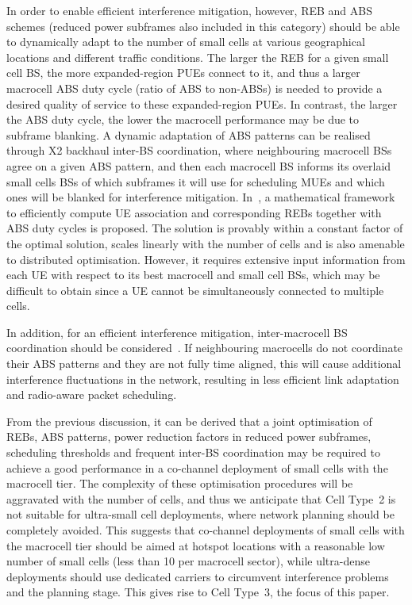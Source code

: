 \documentclass{IEEEtran}
\begin{document}
In order to enable efficient interference mitigation,
however,
\ac{REB} and \ac{ABS} schemes (reduced power subframes also included in this category) should be able to dynamically adapt to the number of small cells at various geographical locations and different traffic conditions.
The larger the \ac{REB} for a given small cell \ac{BS},
the more expanded-region \acp{PUE} connect to it,
and thus a larger macrocell  \ac{ABS} duty cycle (ratio of ABS to non-ABSs) is needed to provide a desired quality of service to these expanded-region \acp{PUE}.
In contrast, the larger the \ac{ABS} duty cycle,
the lower the macrocell performance may be due to subframe blanking.
A dynamic adaptation of \ac{ABS} patterns can be realised through X2 backhaul inter-BS coordination,
where neighbouring macrocell \acp{BS} agree on a given \ac{ABS} pattern, 
and then  each macrocell \ac{BS} informs its overlaid small cells \acp{BS} of which subframes it will use for scheduling \acp{MUE} and which ones will be blanked for interference mitigation.
In~\cite{Deb2013}, a mathematical framework to efficiently compute \ac{UE} association and corresponding \acp{REB} together with \ac{ABS} duty cycles is proposed.
The solution is provably within a constant factor of the optimal solution,
scales linearly with the number of cells
and is also amenable to distributed optimisation.
However, it requires extensive input information from each \ac{UE} with respect to its best macrocell and small cell \acp{BS},
which may be difficult to obtain since a \ac{UE} cannot be simultaneously connected to multiple cells.

In addition, for an efficient interference mitigation,
inter-macrocell \ac{BS} coordination should be considered~\cite{6692277}.
If neighbouring macrocells do not coordinate their \ac{ABS} patterns and they are not fully time aligned,
this will cause additional interference fluctuations in the network,
resulting in less efficient link adaptation and radio-aware packet scheduling.

From the previous discussion,
it can be derived that
a joint optimisation of \acp{REB}, \ac{ABS} patterns, power reduction factors in reduced power subframes, scheduling thresholds and frequent inter-\ac{BS} coordination may be required to achieve a good performance in a co-channel deployment of small cells with the macrocell tier.
The complexity of these optimisation procedures will be aggravated with the number of cells,
and thus we anticipate that  Cell Type~2 is not suitable for ultra-small cell deployments,
where network planning should be completely avoided.
This suggests that co-channel deployments of small cells with the macrocell tier should be aimed at hotspot locations with a reasonable low number of small cells (less than 10 per macrocell sector),
while ultra-dense deployments should use dedicated carriers to circumvent interference problems and the planning stage.
This gives rise to Cell Type~3, the focus of this paper.
\end{document}

